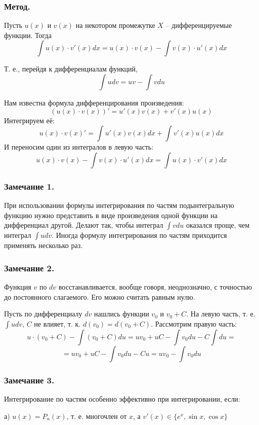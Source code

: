 \subsubsection{Метод.}
Пусть $u(x)$ и $v(x)$ на некотором промежутке $X$ -- дифференцируемые функции. Тогда
$$\int u(x)\cdot v'(x)dx=u(x)\cdot v(x) - \int v(x) \cdot u'(x)dx$$

Т. е., перейдя к дифференциалам функций,
$$\int udv=uv- \int vdu$$

\dokvo
Нам известна формула дифференцирования произведения:
$$(u(x)\cdot v(x))'=u'(x)v(x)+v'(x)u(x)$$
Интегрируем её:
$$u(x)\cdot v(x)'=\int u'(x)v(x) dx +\int v'(x)u(x) dx$$
И переносим один из интегралов в левую часть:
$$u(x)\cdot v(x) - \int v(x) \cdot u'(x)dx=\int u(x)\cdot v'(x)dx$$

\dokno

\subsubsection{Замечание 1.}

При использовании формулы интегрирования по частям подынтегральную функцию нужно представить в виде произведения одной функции на дифференциал другой.
Делают так, чтобы интеграл $\int vdu$ оказался проще, чем интеграл $\int udv$.
Иногда формулу интегрирования по частям приходится применять несколько раз.

\subsubsection{Замечание 2.}

Функция $v$ по $dv$ восстанавливается, вообще говоря, неоднозначно, с точностью до постоянного слагаемого. Его можно считать равным нулю.

\dokvo
Пусть по дифференциалу $dv$ нашлись функции $v_0$ и $v_0+C$. На левую часть, т. е. $\int udv$, $C$ не влияет, т. к. $d(v_0)=d(v_0+C)$. Рассмотрим правую часть:
$$
u\cdot (v_0+C) - \int (v_0+C)du=
uv_0+uC-\int v_0 du - C\int du=$$$$=
uv_0+uC-\int v_0 du - Cu=
uv_0-\int v_0 du
$$
\dokno

\subsubsection{Замечание 3.}
Интегрирование по частям особенно эффективно при интегрировании, если:

а) $u(x)=P_n(x)$, т. е. многочлен от $x$, а $v'(x) \in \{e^x,\sin x,\cos x\}$

